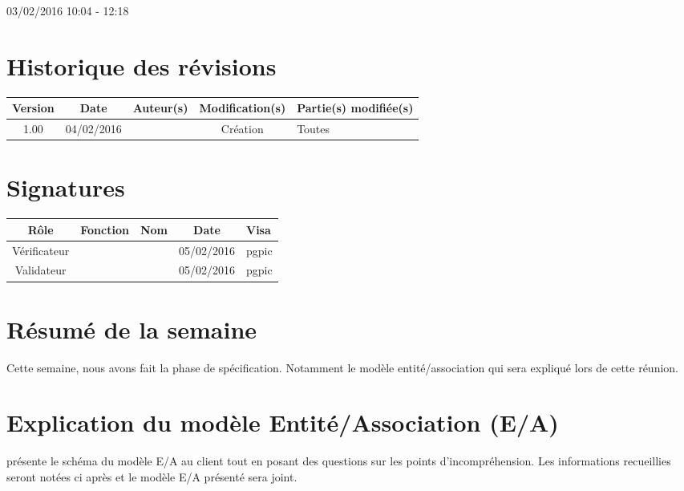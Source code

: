 \documentclass [a4paper] {article}
\begin{document}
03/02/2016			 				%
\hfill   
\hfill 	 10:04 - 12:18 				%


\section*{Historique des révisions}
\begin{center}
			\begin{tabular}{| c | c | c | c | p{4cm} |}
				\hline
				\rowcolor{Gray}
				Version & Date & Auteur(s) & Modification(s) & Partie(s) modifiée(s)		 \\
				\hline
				1.00 & 04/02/2016 & \Pierre & Création & Toutes \\
		\hline		
			\end{tabular}
		\end{center}

\section*{Signatures}

		\begin{center}
			\begin{tabular}{| c | c | c | c | p{4cm} |}
				\hline
				\rowcolor{Gray}
				Rôle & Fonction & Nom & Date & Visa		 \\
				\hline
				Vérificateur & \RQA & \Kafui & 05/02/2016 & pgpic \\[30pt]
				\hline
				Validateur & \CP & \Sergi & 05/02/2016 & pgpic \\[30pt]	
				\hline
			\end{tabular}
		\end{center}


\section{Résumé de la semaine}
Cette semaine, nous avons fait la phase de spécification. Notamment le modèle entité/association qui sera expliqué lors de cette réunion.


\section{Explication du modèle Entité/Association (E/A)}
\Julie{} présente le schéma du modèle E/A au client tout en posant des questions sur les points d'incompréhension. Les informations recueillies seront notées ci après et le modèle E/A présenté sera joint.
\\
\end{document}
